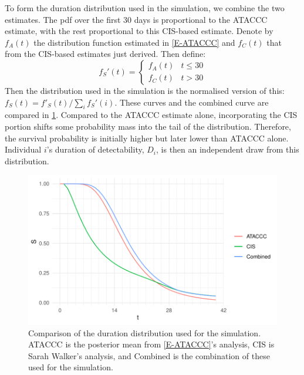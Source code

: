 \documentclass[thesis.tex]{subfiles}
\begin{document}

To form the duration distribution used in the simulation, we combine the two estimates.
The pdf over the first 30 days is proportional to the ATACCC estimate, with the rest proportional to this CIS-based estimate.
Denote by $f_A(t)$ the distribution function estimated in \cref{E-ATACCC} and $f_C(t)$ that from the CIS-based estimates just derived.
Then define:
$$
f_S'(t) = \begin{cases}
	f_A(t) &t \leq 30 \\
	f_C(t) &t > 30
\end{cases}
$$
Then the distribution used in the simulation is the normalised version of this: $f_S(t) = f'_S(t)/\sum_i f_S'(i)$.
These curves and the combined curve are compared in \cref{perf-test:fig:duration-dist}.
Compared to the ATACCC estimate alone, incorporating the CIS portion shifts some probability mass into the tail of the distribution.
Therefore, the survival probability is initially higher but later lower than ATACCC alone.
Individual $i$'s duration of detectability, $D_i$, is then an independent draw from this distribution.
\begin{figure}
  \centering \includegraphics{cis-perfect-testing/input-duration-dists}
  \caption[Comparison of duration distributions]{Comparison of the duration distribution used for the simulation. ATACCC is the posterior mean from \cref{E-ATACCC}'s analysis, CIS is Sarah Walker's analysis, and Combined is the combination of these used for the simulation. \label{perf-test:fig:duration-dist}}
\end{figure}
\end{document}
